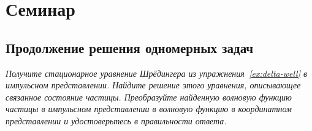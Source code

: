 \section{Семинар \thesection}
\subsection{Продолжение решения одномерных задач}
\begin{exercise}
  \textit{Получите стационарное уравнение Шрёдингера из упражнения
    \textnumero\,\ref{ex:delta-well} в импульсном представлении. Найдите решение
    этого уравнения, описывающее связанное состояние частицы. Преобразуйте
    найденную волновую функцию частицы в импульсном представлении в волновую
    функцию в координатном представлении и удостоверьтесь в правильности ответа.}
\end{exercise}

